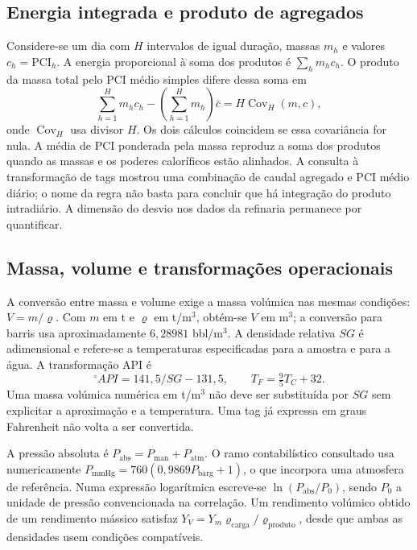 \subsection{Energia integrada e produto de agregados}
\label{sec:mat-produto-medias}
Considere-se um dia com $H$ intervalos de igual duração, massas $m_h$ e valores $c_h=\mathrm{PCI}_h$. A energia proporcional à soma dos produtos é $\sum_hm_hc_h$. O produto da massa total pelo PCI médio simples difere dessa soma em
\begin{equation}
\sum_{h=1}^H m_hc_h-\left(\sum_{h=1}^Hm_h\right)\bar c
=H\operatorname{Cov}_H(m,c),
\label{eq:mat-covariancia-agregacao}
\end{equation}
onde $\operatorname{Cov}_H$ usa divisor $H$. Os dois cálculos coincidem se essa covariância for nula. A média de PCI ponderada pela massa reproduz a soma dos produtos quando as massas e os poderes caloríficos estão alinhados. A consulta à transformação de tags mostrou uma combinação de caudal agregado e PCI médio diário; o nome da regra não basta para concluir que há integração do produto intradiário. A dimensão do desvio nos dados da refinaria permanece por quantificar.

\subsection{Massa, volume e transformações operacionais}
\label{sec:mat-transformacoes}
A conversão entre massa e volume exige a massa volúmica nas mesmas condições: $V=m/\varrho$. Com $m$ em t e $\varrho$ em t/m$^3$, obtém-se $V$ em m$^3$; a conversão para barris usa aproximadamente $6{,}28981$ bbl/m$^3$. A densidade relativa $SG$ é adimensional e refere-se a temperaturas especificadas para a amostra e para a água. A transformação API é
\begin{equation}
{}^{\circ}\!API=141{,}5/SG-131{,}5,
\qquad T_F=\tfrac95T_C+32.
\label{eq:mat-api-temperatura}
\end{equation}
Uma massa volúmica numérica em t/m$^3$ não deve ser substituída por $SG$ sem explicitar a aproximação e a temperatura. Uma tag já expressa em graus Fahrenheit não volta a ser convertida.

A pressão absoluta é $P_{\mathrm{abs}}=P_{\mathrm{man}}+P_{\mathrm{atm}}$. O ramo contabilístico consultado usa numericamente $P_{\mathrm{mmHg}}=760(0{,}9869P_{\mathrm{barg}}+1)$, o que incorpora uma atmosfera de referência. Numa expressão logarítmica escreve-se $\ln(P_{\mathrm{abs}}/P_0)$, sendo $P_0$ a unidade de pressão convencionada na correlação. Um rendimento volúmico obtido de um rendimento mássico satisfaz $Y_V=Y_m\varrho_{\mathrm{carga}}/\varrho_{\mathrm{produto}}$, desde que ambas as densidades usem condições compatíveis.

